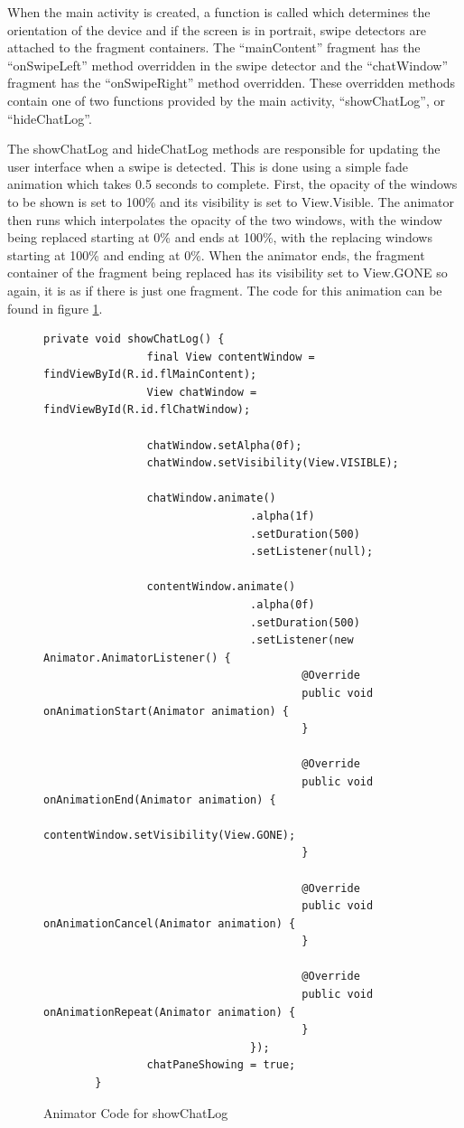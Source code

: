 When the main activity is created, a function is called which determines the orientation of the device and if the screen is in portrait, swipe detectors are attached to the fragment containers.  The ``mainContent'' fragment has the ``onSwipeLeft'' method overridden in the swipe detector and the ``chatWindow'' fragment has the ``onSwipeRight'' method overridden.  These overridden methods contain one of two functions provided by the main activity, ``showChatLog'', or ``hideChatLog''.

The showChatLog and hideChatLog methods are responsible for updating the user interface when a swipe is detected.  This is done using a simple fade animation which takes 0.5 seconds to complete.  First, the opacity of the windows to be shown is set to 100\% and its visibility is set to View.Visible.  The animator then runs which interpolates the opacity of the two windows, with the window being replaced starting at 0\% and ends at 100\%, with the replacing windows starting at 100\% and ending at 0\%.  When the animator ends, the fragment container of the fragment being replaced has its visibility set to View.GONE so again, it is as if there is just one fragment.  The code for this animation can be found in figure \ref{fig:showChatLog}.

\begin{figure}[!htpb]
	\centering
	\lstset{language=Java}
	\begin{lstlisting}[tabsize=2,breaklines=true]
		private void showChatLog() {
				final View contentWindow = findViewById(R.id.flMainContent);
				View chatWindow = findViewById(R.id.flChatWindow);

				chatWindow.setAlpha(0f);
				chatWindow.setVisibility(View.VISIBLE);

				chatWindow.animate()
								.alpha(1f)
								.setDuration(500)
								.setListener(null);

				contentWindow.animate()
								.alpha(0f)
								.setDuration(500)
								.setListener(new Animator.AnimatorListener() {
										@Override
										public void onAnimationStart(Animator animation) {
										}

										@Override
										public void onAnimationEnd(Animator animation) {
												contentWindow.setVisibility(View.GONE);
										}

										@Override
										public void onAnimationCancel(Animator animation) {
										}

										@Override
										public void onAnimationRepeat(Animator animation) {
										}
								});
				chatPaneShowing = true;
		}
	\end{lstlisting}
	\caption{Animator Code for showChatLog}
	\label{fig:showChatLog}
\end{figure}


